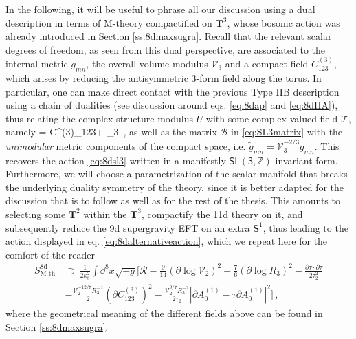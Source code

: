 In the following, it will be useful to phrase all our discussion using a dual description in terms of M-theory compactified on $\mathbf{T}^3$, whose bosonic action was already introduced in Section \ref{ss:8dmaxsugra}. Recall that the relevant scalar degrees of freedom, as seen from this dual perspective, are associated to the internal metric $g_{mn}$, the overall volume modulus $\mathcal{V}_3$ and a compact field $C^{(3)}_{123}$, which arises by reducing the antisymmetric 3-form field along the torus. In particular, one can make direct contact with the previous Type IIB description using a chain of dualities (see discussion around eqs. \eqref{eq:8dap} and \eqref{eq:8dIIA}), thus relating the complex structure modulus $U$ with some complex-valued field $\mathcal{T}$, namely
%
\beq\label{eq:T3complexvolume}
= C^{(3)}_{123}+  _3\, ,
\eeq
%
as well as the matrix $\mathcal{B}$ in \eqref{eq:SL3matrix} with the \emph{unimodular} metric components of the compact space, i.e. $\tilde{g}_{m n}= \mathcal{V}_3^{-2/3} g_{mn}$. This recovers the action \eqref{eq:8dsl3} written in a manifestly $\mathsf{SL(3,\mathbb{Z})}$ invariant form. Furthermore, we will choose a parametrization of the scalar manifold that breaks the underlying duality symmetry of the theory, since it is better adapted for the discussion that is to follow as well as for the rest of the thesis. This amounts to selecting some $\mathbf{T}^2$ within the $\mathbf{T}^3$, compactify the 11d theory on it, and subsequently reduce the 9d supergravity EFT on an extra $\mathbf{S}^1$, thus leading to the action displayed in eq. \eqref{eq:8dalternativeaction}, which we repeat here for the comfort of the reader
%
\begin{equation}\label{eq:8dalternativeactionII}
	\begin{aligned}
			S_\text{M-th}^{\text{8d}}\, &\supset\, \frac{1}{2\kappa_{8}^2} \int \dd^{8}x\sqrt{-g} \Bigg[\mathcal{R}-\frac{9}{14} \left( \partial \log \mathcal{V}_2\right)^2 - \frac{7}{6} \left( \partial \log R_3\right)^2 -\frac{\partial \tau \cdot \partial \bar \tau}{2 \tau_2^2}\\
            &- \frac{\mathcal{V}_2^{-12/7} R_3^{-2}}{2} \left( \partial C_{123}^{(3)}\right)^2 -\frac{\mathcal{V}_2^{9/7} R_3^{-2}}{2 \tau_2} \left| \partial A^{(1)}_0-\tau \partial A^{(1)}_0 \right|^2\Bigg]\, ,
	\end{aligned}
\end{equation}
%
where the geometrical meaning of the different fields above can be found in Section \ref{ss:8dmaxsugra}.

